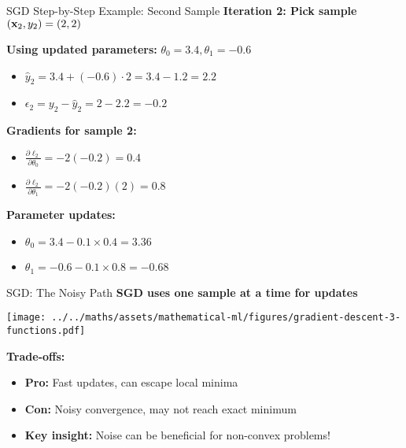 \documentclass[usenames,dvipsnames]{beamer}
\begin{document}
  \begin{frame}{SGD Step-by-Step Example: Second Sample}
    \textbf{Iteration 2: Pick sample $(\mathbf{x}_2, y_2) = (2, 2)$}
    
    \pause
    \textbf{Using updated parameters:} $\theta_0 = 3.4, \theta_1 = -0.6$
    \begin{itemize}[<+->]
        \item $\hat{y}_2 = 3.4 + (-0.6) \cdot 2 = 3.4 - 1.2 = 2.2$
        \item $\epsilon_2 = y_2 - \hat{y}_2 = 2 - 2.2 = -0.2$
    \end{itemize}
    
    \pause
    \textbf{Gradients for sample 2:}
    \begin{itemize}[<+->]
        \item $\frac{\partial \ell_2}{\partial \theta_0} = -2(-0.2) = 0.4$
        \item $\frac{\partial \ell_2}{\partial \theta_1} = -2(-0.2)(2) = 0.8$
    \end{itemize}
    
    \pause
    \textbf{Parameter updates:}
    \begin{itemize}[<+->]
        \item $\theta_0 = 3.4 - 0.1 \times 0.4 = 3.36$
        \item $\theta_1 = -0.6 - 0.1 \times 0.8 = -0.68$
    \end{itemize}
  \end{frame}

  \begin{frame}{SGD: The Noisy Path}
    \textbf{SGD uses one sample at a time for updates}
    
    \begin{center}
    \texttt{[image: ../../maths/assets/mathematical-ml/figures/gradient-descent-3-functions.pdf]}
    \end{center}
    
    \pause
    \textbf{Trade-offs:}
    \begin{itemize}[<+->]
        \item \textbf{Pro:} Fast updates, can escape local minima
        \item \textbf{Con:} Noisy convergence, may not reach exact minimum
        \item \textbf{Key insight:} Noise can be beneficial for non-convex problems!
    \end{itemize}
  \end{frame}
\end{document}
